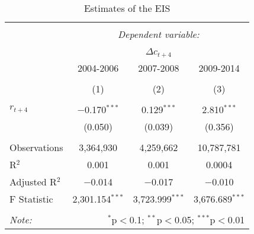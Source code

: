 
\begin{table}[!htbp] \centering 
  \caption{Estimates of the EIS} 
  \label{FEResultsSeparated} 
\begin{tabular}{@{\extracolsep{5pt}}lccc} 
\\[-1.8ex]\hline 
\hline \\[-1.8ex] 
 & \multicolumn{3}{c}{\textit{Dependent variable:}} \\ 
\cline{2-4} 
\\[-1.8ex] & \multicolumn{3}{c}{$\Delta c_{t+4}$} \\ 
 & 2004-2006 & 2007-2008 & 2009-2014 \\ 
\\[-1.8ex] & (1) & (2) & (3)\\ 
\hline \\[-1.8ex] 
 $r_{t+4}$ & $-$0.170$^{***}$ & 0.129$^{***}$ & 2.810$^{***}$ \\ 
  & (0.050) & (0.039) & (0.356) \\ 
 \hline \\[-1.8ex] 
Observations & 3,364,930 & 4,259,662 & 10,787,781 \\ 
R$^{2}$ & 0.001 & 0.001 & 0.0004 \\ 
Adjusted R$^{2}$ & $-$0.014 & $-$0.017 & $-$0.010 \\ 
F Statistic & 2,301.154$^{***}$ & 3,723.999$^{***}$ & 3,676.689$^{***}$ \\ 
\hline 
\hline \\[-1.8ex] 
\textit{Note:}  & \multicolumn{3}{r}{$^{*}$p$<$0.1; $^{**}$p$<$0.05; $^{***}$p$<$0.01} \\ 
\end{tabular} 
\end{table} 
